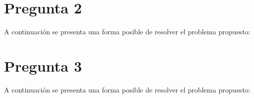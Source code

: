 \newpage
\section*{Pregunta 2}

A continuación se presenta una forma posible de resolver el problema propuesto:


\newpage
\section*{Pregunta 3}

A continuación se presenta una forma posible de resolver el problema propuesto:
